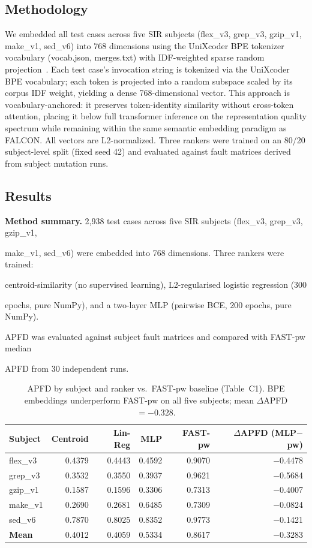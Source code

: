 \documentclass[conference]{IEEEtran}
\begin{document}
\subsection{Methodology}

We embedded all test cases across five SIR subjects (flex\_v3, grep\_v3, gzip\_v1, make\_v1, sed\_v6) into 768 dimensions using the UniXcoder BPE tokenizer vocabulary (vocab.json, merges.txt) with IDF-weighted sparse random projection~\cite{achlioptas2003}. Each test case's invocation string is tokenized via the UniXcoder BPE vocabulary; each token is projected into a random subspace scaled by its corpus IDF weight, yielding a dense 768-dimensional vector. This approach is vocabulary-anchored: it preserves token-identity similarity without cross-token attention, placing it below full transformer inference on the representation quality spectrum while remaining within the same semantic embedding paradigm as FALCON. All vectors are L2-normalized. Three rankers were trained on an 80/20 subject-level split (fixed seed 42) and evaluated against fault matrices derived from subject mutation runs.

\subsection{Results}

\textbf{Method summary.} 2,938 test cases across five SIR subjects (flex\_v3, grep\_v3, gzip\_v1,

make\_v1, sed\_v6) were embedded into 768 dimensions.  Three rankers were trained:

centroid-similarity (no supervised learning), L2-regularised logistic regression (300

epochs, pure NumPy), and a two-layer MLP (pairwise BCE, 200 epochs, pure NumPy).

APFD was evaluated against subject fault matrices and compared with FAST-pw median

APFD from 30 independent runs.


\begin{table}[t]
\caption{APFD by subject and ranker vs.\ FAST-pw baseline (Table~C1). BPE embeddings underperform FAST-pw on all five subjects; mean $\Delta$APFD $= -0.328$.}
\centering
\begin{tabular}{lrrrrr}
\toprule
\textbf{Subject} & \textbf{Centroid} & \textbf{Lin-Reg} & \textbf{MLP} & \textbf{FAST-pw} & \textbf{$\Delta$APFD (MLP$-$pw)} \\
\midrule
flex\_v3 & 0.4379 & 0.4443 & 0.4592 & 0.9070 & $-$0.4478 \\
grep\_v3 & 0.3532 & 0.3550 & 0.3937 & 0.9621 & $-$0.5684 \\
gzip\_v1 & 0.1587 & 0.1596 & 0.3306 & 0.7313 & $-$0.4007 \\
make\_v1 & 0.2690 & 0.2681 & 0.6485 & 0.7309 & $-$0.0824 \\
sed\_v6 & 0.7870 & 0.8025 & 0.8352 & 0.9773 & $-$0.1421 \\
\midrule
\textbf{Mean} & 0.4012 & 0.4059 & 0.5334 & 0.8617 & $\mathbf{-0.3283}$ \\
\bottomrule
\end{tabular}
\end{table}
\end{document}
